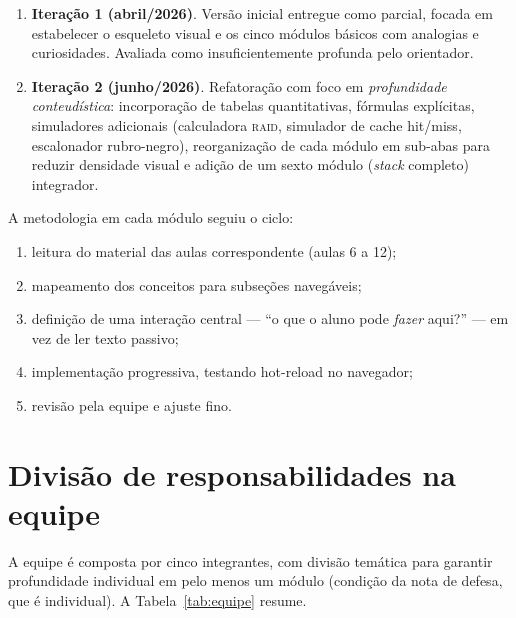 \begin{enumerate}
    \item \textbf{Iteração 1 (abril/2026)}. Versão inicial entregue
          como parcial, focada em estabelecer o esqueleto visual e os
          cinco módulos básicos com analogias e curiosidades. Avaliada
          como insuficientemente profunda pelo orientador.
    \item \textbf{Iteração 2 (junho/2026)}. Refatoração com foco em
          \emph{profundidade conteudística}: incorporação de tabelas
          quantitativas, fórmulas explícitas, simuladores adicionais
          (calculadora \textsc{raid}, simulador de cache hit/miss,
          escalonador rubro-negro), reorganização de cada módulo em
          sub-abas para reduzir densidade visual e adição de um
          sexto módulo (\textit{stack} completo) integrador.
\end{enumerate}

A metodologia em cada módulo seguiu o ciclo:

\begin{enumerate}
    \item leitura do material das aulas correspondente
          (aulas 6 a 12);
    \item mapeamento dos conceitos para subseções navegáveis;
    \item definição de uma interação central ---
          ``o que o aluno pode \emph{fazer} aqui?'' ---
          em vez de ler texto passivo;
    \item implementação progressiva, testando hot-reload no
          navegador;
    \item revisão pela equipe e ajuste fino.
\end{enumerate}

\section{Divisão de responsabilidades na equipe}
\label{sec:equipe}

A equipe é composta por cinco integrantes, com divisão temática
para garantir profundidade individual em pelo menos um módulo
(condição da nota de defesa, que é individual). A
Tabela~\ref{tab:equipe} resume.

